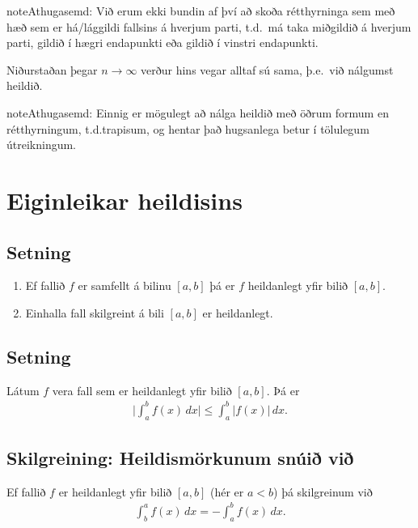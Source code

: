 \documentclass[a4paper,10pt,icelandic]{sphinxmanual}
\begin{document}
\begin{sphinxadmonition}{note}{Athugasemd:}
Við erum ekki bundin af því að skoða rétthyrninga sem með hæð sem er
há/lággildi fallsins á hverjum parti, t.d. má taka miðgildið á hverjum
parti, gildið í hægri endapunkti eða gildið í vinstri endapunkti.

Niðurstaðan þegar \(n\to \infty\) verður hins vegar alltaf sú sama,
þ.e. við nálgumst heildið.
\end{sphinxadmonition}

\begin{sphinxadmonition}{note}{Athugasemd:}
Einnig er mögulegt að nálga heildið með öðrum formum en rétthyrningum,
t.d.trapisum, og hentar það hugsanlega betur í
tölulegum útreikningum.
\end{sphinxadmonition}


\section{Eiginleikar heildisins}
\label{\detokenize{kafli06:eiginleikar-heildisins}}

\subsection{Setning}
\label{\detokenize{kafli06:setning}}\begin{enumerate}
\item {} 
Ef fallið \(f\) er samfellt á bilinu \([a, b]\) þá er
\(f\) heildanlegt yfir bilið \([a, b]\).

\item {} 
Einhalla fall skilgreint á bili \([a,b]\) er heildanlegt.

\end{enumerate}


\subsection{Setning}
\label{\detokenize{kafli06:id2}}
Látum \(f\) vera fall sem er heildanlegt yfir bilið \([a, b]\).
Þá er
\begin{equation*}
\begin{split}\Big|\int_a^b f(x)\,dx\Big|\leq \int_a^b |f(x)|\,dx.\end{split}
\end{equation*}

\subsection{Skilgreining: Heildismörkunum snúið við}
\label{\detokenize{kafli06:skilgreining-heildismorkunum-snui-vi}}
Ef fallið \(f\) er heildanlegt yfir bilið \([a,b]\) (hér er
\(a<b\)) þá skilgreinum við
\begin{equation*}
\begin{split}\int_b^a f(x)\,dx=-\int_a^b f(x)\,dx.\end{split}
\end{equation*}
\end{document}
